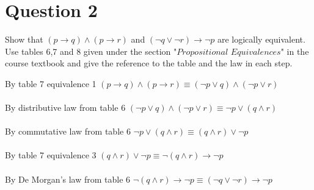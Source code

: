 \documentclass[a4paper,12pt]{article}
\newcommand\tab[1][1cm]{\hspace*{#1}}
\begin{document}
\newpage
\section*{Question 2 \hfill {}}
\tab Show that $(p \rightarrow q) \wedge (p \rightarrow r)$ and $(\neg q \vee \neg r)\rightarrow \neg p$ are logically equivalent. Use tables 6,7 and 8 given under the section "$\textit{Propositional Equivalences}$" in the course textbook and give the reference to the table and the law in each step.

\begin{tcolorbox}
By table 7 equivalence 1 $(p \rightarrow q) \wedge (p \rightarrow r) \equiv (\neg p \vee q) \wedge (\neg p \vee r)$\\\\
By distributive law from table 6 $(\neg p \vee q) \wedge (\neg p \vee r) \equiv \neg p \vee (q \wedge r)$\\\\
By commutative law from table 6 $\neg p \vee (q \wedge r) \equiv (q \wedge r) \vee \neg p$\\\\
By table 7 equivalence 3 $(q \wedge r) \vee \neg p \equiv \neg (q \wedge r) \rightarrow \neg p$\\\\
By De Morgan's law from table 6 $\neg (q \wedge r) \rightarrow \neg p \equiv (\neg q \vee \neg r) \rightarrow \neg p$

\end{tcolorbox}\\\\\\\\\\\\\\\\\\\\\\\\\\\\\\\\\\\\\\\\\\\\\\\\\\\\\\\\
\end{document}
